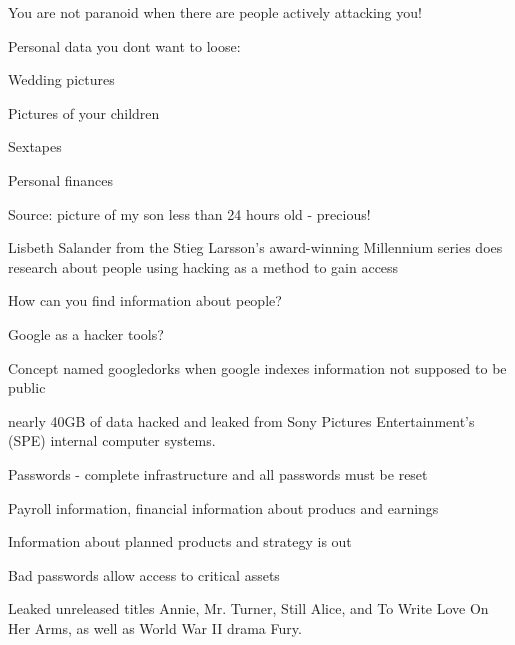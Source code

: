 \documentclass[20pt,landscape,a4paper,footrule]{foils}
\begin{document}
\vskip 1cm
\centerline{You are not paranoid when there are people actively attacking you!}


\begin{list1}
\item Personal data you dont want to loose:
\begin{list2}
\item Wedding pictures
\item Pictures of your children
\item Sextapes
\item Personal finances
\end{list2}
\end{list1}

Source: picture of my son less than 24 hours old - precious!



\begin{list1}
\item Lisbeth Salander from the Stieg Larsson's award-winning Millennium series
does research about people using hacking as a method to gain access
\item How can you find information about people?
\end{list1}




\begin{list1}
\item Google as a hacker tools?
\item Concept named googledorks when google indexes information not supposed to be public
\end{list1}




{\small{}}



\begin{list1}
\item  nearly 40GB of data hacked and leaked from Sony Pictures Entertainment's (SPE) internal computer systems.
\item Passwords - complete infrastructure and all passwords must be reset
\item Payroll information, financial information about producs and earnings
\item Information about planned products and strategy is out
\item Bad passwords allow access to critical assets
\item Leaked unreleased titles Annie, Mr. Turner, Still Alice, and To Write Love On Her Arms, as well as World War II drama Fury.
\end{list1}
\end{document}
